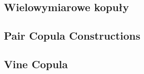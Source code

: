 \subsection{Wielowymiarowe kopuły}
\label{subsec:wielowymiarowe_kopuly}
		
\subsection{Pair Copula Constructions}
\label{subsec:pair_copula_constructions}
	
\subsection{Vine Copula}
\label{subsec:vine_copula}
